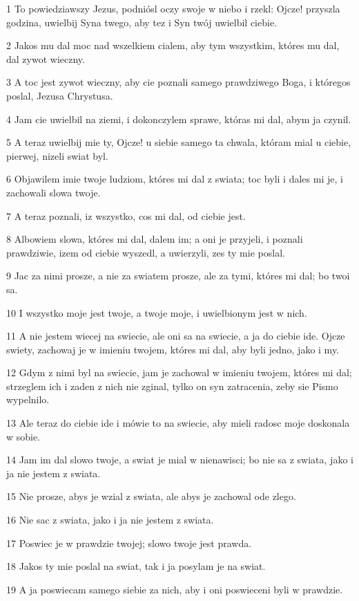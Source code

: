 \par 1 To powiedziawszy Jezus, podniósl oczy swoje w niebo i rzekl: Ojcze! przyszla godzina, uwielbij Syna twego, aby tez i Syn twój uwielbil ciebie.
\par 2 Jakos mu dal moc nad wszelkiem cialem, aby tym wszystkim, któres mu dal, dal zywot wieczny.
\par 3 A toc jest zywot wieczny, aby cie poznali samego prawdziwego Boga, i któregos poslal, Jezusa Chrystusa.
\par 4 Jam cie uwielbil na ziemi, i dokonczylem sprawe, któras mi dal, abym ja czynil.
\par 5 A teraz uwielbij mie ty, Ojcze! u siebie samego ta chwala, któram mial u ciebie, pierwej, nizeli swiat byl.
\par 6 Objawilem imie twoje ludziom, któres mi dal z swiata; toc byli i dales mi je, i zachowali slowa twoje.
\par 7 A teraz poznali, iz wszystko, cos mi dal, od ciebie jest.
\par 8 Albowiem slowa, któres mi dal, dalem im; a oni je przyjeli, i poznali prawdziwie, izem od ciebie wyszedl, a uwierzyli, zes ty mie poslal.
\par 9 Jac za nimi prosze, a nie za swiatem prosze, ale za tymi, któres mi dal; bo twoi sa.
\par 10 I wszystko moje jest twoje, a twoje moje, i uwielbionym jest w nich.
\par 11 A nie jestem wiecej na swiecie, ale oni sa na swiecie, a ja do ciebie ide. Ojcze swiety, zachowaj je w imieniu twojem, któres mi dal, aby byli jedno, jako i my.
\par 12 Gdym z nimi byl na swiecie, jam je zachowal w imieniu twojem, któres mi dal; strzeglem ich i zaden z nich nie zginal, tylko on syn zatracenia, zeby sie Pismo wypelnilo.
\par 13 Ale teraz do ciebie ide i mówie to na swiecie, aby mieli radosc moje doskonala w sobie.
\par 14 Jam im dal slowo twoje, a swiat je mial w nienawisci; bo nie sa z swiata, jako i ja nie jestem z swiata.
\par 15 Nie prosze, abys je wzial z swiata, ale abys je zachowal ode zlego.
\par 16 Nie sac z swiata, jako i ja nie jestem z swiata.
\par 17 Poswiec je w prawdzie twojej; slowo twoje jest prawda.
\par 18 Jakos ty mie poslal na swiat, tak i ja posylam je na swiat.
\par 19 A ja poswiecam samego siebie za nich, aby i oni poswieceni byli w prawdzie.
